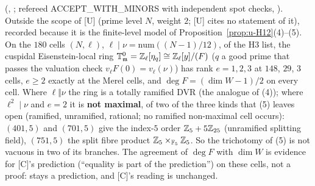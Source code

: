 \documentclass[11pt]{article}
\newcommand{\Zl}{\Z_\ell}
\begin{document}
\begin{remark}\label{rmk:u-H3prime}
\COMP{} (, ; refereed ACCEPT\_WITH\_MINORS with independent spot checks, ). Outside the scope of
[U] (prime level $N$, weight $2$; [U] cites no statement of it), recorded because it is the finite-level model of Proposition~\ref{prop:u-H12}(4)--(5). On the $180$ cells $(N,\ell)$,
$\ell\mid\nu=\mathrm{num}((N-1)/12)$, of the H3 list, the cuspidal Eisenstein-local ring $\mathbb T^{0}_{\mathfrak m}=\Zl[\eta_q]\cong\Zl[y]/(F)$ ($q$ a good prime that passes the
valuation check $v_\ell F(0)=v_\ell(\nu)$) has rank $e=1,2,3$ at $148$, $29$, $3$ cells, $e\ge2$ exactly at the Merel cells, and $\deg F=(\dim W-1)/2$ on every cell. Where
$\ell\Vert\nu$ the ring is a totally ramified DVR (the analogue of (4)); where $\ell^{2}\mid\nu$ and $e=2$ it is \textbf{not maximal}, of two of the three kinds that (5) leaves open (ramified, unramified, rational; no ramified non-maximal cell occurs):
$(401,5)$ and $(701,5)$ give the index-$5$ order $\mathbb{Z}_5+5\mathbb{Z}_{25}$ (unramified splitting field), $(751,5)$ the split fibre product $\mathbb{Z}_5\times_{\mathbb{F}_5}\mathbb{Z}_5$. So the trichotomy of (5) is not
vacuous in two of its branches. The agreement of $\deg F$ with $\dim W$ is evidence for [C]'s prediction  (``equality is part of the prediction'') on these cells, not a proof:  stays a
prediction, and [C]'s  reading is unchanged.
\end{remark}
\end{document}

